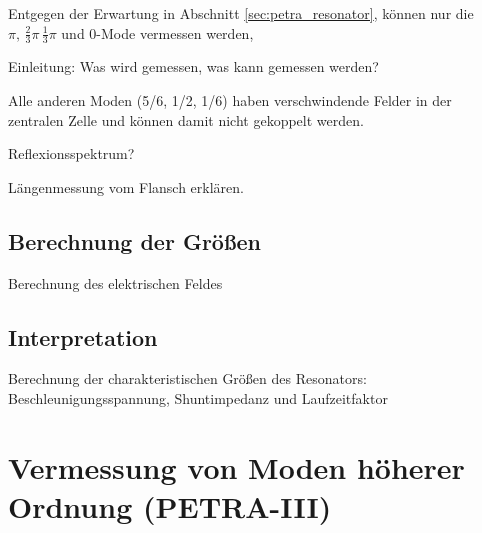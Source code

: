 Entgegen der Erwartung in Abschnitt \ref{sec:petra_resonator}, können nur die $\pi,\, \frac{2}{3} \pi \, \frac{1}{3} \pi$ und $0$-Mode vermessen werden, 


Einleitung: Was wird gemessen, was kann gemessen werden?

Alle anderen Moden (5/6, 1/2, 1/6) haben verschwindende Felder in der zentralen Zelle und können damit nicht gekoppelt werden.

Reflexionsspektrum?


Längenmessung vom Flansch erklären.



\subsection{Berechnung der Größen}
Berechnung des elektrischen Feldes\\

\subsection{Interpretation}
Berechnung der charakteristischen Größen des Resonators: Beschleunigungsspannung, Shuntimpedanz und Laufzeitfaktor



\section{Vermessung von Moden höherer Ordnung (PETRA-III)}
